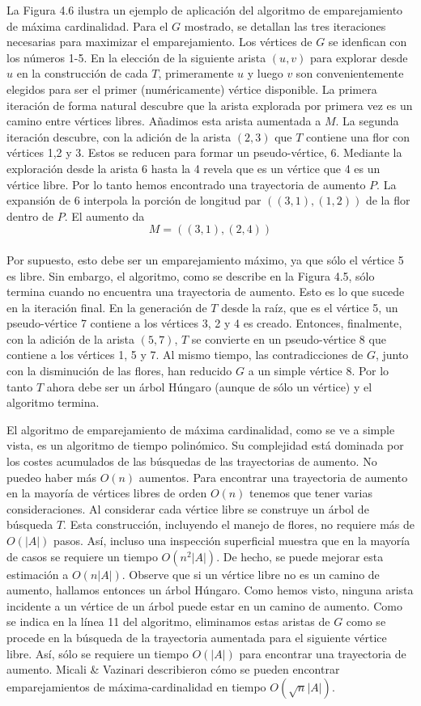 \documentclass[10pt,a5paper]{book}
\begin{document}
La Figura 4.6 ilustra un ejemplo de aplicación del algoritmo de emparejamiento de máxima cardinalidad. Para el $G$ mostrado, se detallan las tres iteraciones necesarias para maximizar el emparejamiento. Los vértices de $G$ se idenfican con los números 1-5. En la elección de la siguiente arista $(u,v)$ para explorar desde $u$ en la construcción de cada $T$, primeramente $u$ y luego $v$ son convenientemente elegidos para ser el primer (numéricamente) vértice disponible. La primera iteración de forma natural descubre que la arista explorada por primera vez es un camino entre vértices libres. Añadimos esta arista aumentada a $M$. La segunda iteración descubre, con la adición de la arista $(2,3)$ que $T$ contiene una flor con vértices 1,2 y 3. Estos se reducen para formar un pseudo-vértice, 6. Mediante la exploración desde la arista 6 hasta la 4 revela que es un vértice que 4 es un vértice libre. Por lo tanto hemos encontrado una trayectoria de aumento $P$. La expansión de 6 interpola la porción de longitud par $((3,1),(1,2))$ de la flor dentro de $P$. El aumento da
$$ M = ((3,1),(2,4)) $$\\
Por supuesto, esto debe ser un emparejamiento máximo, ya que sólo el vértice 5 es libre. Sin embargo, el algoritmo, como se describe en la Figura 4.5, sólo termina cuando no encuentra una trayectoria de aumento. Esto es lo que sucede en la iteración final. En la generación de $T$ desde la raíz, que es el vértice 5, un pseudo-vértice 7 contiene a los vértices 3, 2 y 4 es creado. Entonces, finalmente, con la adición de la arista $(5,7)$, $T$ se convierte en un pseudo-vértice 8 que contiene a los vértices 1, 5 y 7. Al mismo tiempo, las contradicciones de $G$, junto con la disminución de las flores, han reducido $G$ a un simple vértice 8. Por lo tanto $T$ ahora debe ser un árbol Húngaro (aunque de sólo un vértice) y el algoritmo termina.

El algoritmo de emparejamiento de máxima cardinalidad, como se ve a simple vista, es un algoritmo de tiempo polinómico. Su complejidad está dominada por los costes acumulados de las búsquedas de las trayectorias de aumento. No puedeo haber más $O(n)$ aumentos. Para encontrar una trayectoria de aumento en la mayoría de vértices libres de orden $O(n)$ tenemos que tener varias consideraciones. Al considerar cada vértice libre se construye un árbol de búsqueda $T$. Esta construcción, incluyendo el manejo de flores, no requiere más de $O(|A|)$ pasos. Así, incluso una inspección superficial muestra que en la mayoría de casos se requiere un tiempo $O(n^2|A|)$. De hecho, se puede mejorar esta estimación a $O(n|A|)$. Observe que si un vértice libre no es un camino de aumento, hallamos entonces un árbol Húngaro. Como hemos visto, ninguna arista incidente a un vértice de un árbol puede estar en un camino de aumento. Como se indica en la línea 11 del algoritmo, eliminamos estas aristas de $G$ como se procede en la búsqueda de la trayectoria aumentada para el siguiente vértice libre. Así, sólo se requiere un tiempo $O(|A|)$ para encontrar una trayectoria de aumento. Micali \& Vazinari \cite{m} describieron cómo se pueden encontrar emparejamientos de máxima-cardinalidad en tiempo $O(\sqrt n |A|)$.
\end{document}
